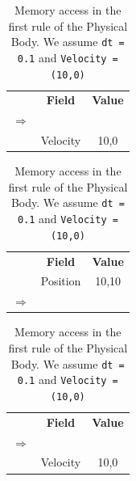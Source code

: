 \begin{table}
	\centering
	\begin{tabular}{c|c|c|}
		\cline{2-3}
		& \textbf{Field} & \textbf{Value} \\
		\cline{2-3}
		$\Rightarrow$ & \cellcolor{green}{Position}	& \cellcolor{green}{10,10} \\ 
		\cline{2-3}
	  & Velocity & 10,0 \\
		\cline{2-3}
	\end{tabular}
	
	\vspace{0.15cm}
	\begin{tabular}{c|c|c|}
		\cline{2-3}
		& \textbf{Field} & \textbf{Value} \\
		\cline{2-3}
	  & Position	& 10,10 \\ 
		\cline{2-3}
		$\Rightarrow$ & \cellcolor{green}{Velocity} & \cellcolor{green}{10,0} \\
		\cline{2-3}
	\end{tabular}
	
	\vspace{0.15cm}
	\begin{tabular}{c|c|c|}
		\cline{2-3}
		& \textbf{Field} & \textbf{Value} \\
		\cline{2-3}
		$\Rightarrow$ & \cellcolor{green}{Position}	& \cellcolor{green}{11,10} \\ 
		\cline{2-3}
		& Velocity & 10,0 \\
		\cline{2-3}
	\end{tabular}

	\caption{Memory access in the first rule of the Physical Body. We assume \texttt{dt = 0.1} and \texttt{Velocity = (10,0)}}
	\label{tab:ch_functors_physical_body_access1_1}
\end{table}

